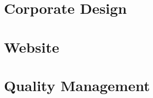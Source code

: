 \section{Corporate Design}
\def\kapitelautor{Julian Lorenz}

\section{Website}
\def\kapitelautor{Julian Lorenz}


\section{Quality Management}
\def\kapitelautor{Julian Lorenz}

